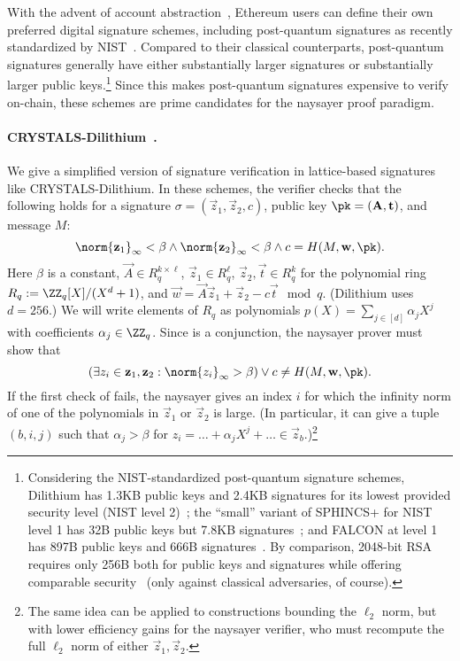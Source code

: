 With the advent of account abstraction~\cite{accountabstraction}, Ethereum users can define their own preferred digital signature schemes, including post-quantum signatures as recently standardized by NIST~\cite{CCS:BHKNRS19,TCHES:DKLLS18,NISTPQC:FALCON22}.
Compared to their classical counterparts, post-quantum signatures generally have either substantially larger signatures or substantially larger public keys.\footnote{Considering the NIST-standardized post-quantum signature schemes, Dilithium has 1.3KB public keys and 2.4KB signatures for its lowest provided security level (NIST level 2)~\cite{dilithium-spec}; the ``small'' variant of SPHINCS+ for NIST level 1 has 32B public keys but 7.8KB signatures~\cite{sphincsplus-spec}; and FALCON at level 1 has 897B public keys and 666B signatures~\cite{falcon-spec}. By comparison, 2048-bit RSA requires only 256B both for public keys and signatures while offering comparable security~\cite{keylength} (only against classical adversaries, of course).}
Since this makes post-quantum signatures expensive to verify on-chain, these schemes are prime candidates for the naysayer proof paradigm.

\paragraph{CRYSTALS-Dilithium~\cite{TCHES:DKLLS18}.} We give a simplified version of signature verification in lattice-based signatures like CRYSTALS-Dilithium. In these schemes, the verifier checks that the following holds for a signature $\sigma=(\vec{z}_1,\vec{z}_2,c)$, public key $\pk=(\vec{A},\vec{t})$, and message $M$:
\begin{equation}\label{eq:crystals_verifier_check}
    \norm{\vec{z}_1}_\infty < \beta \land
    \norm{\vec{z}_2}_\infty < \beta \land 
    c=H(M, \vec{w}, \pk).
\end{equation}
Here $\beta$ is a constant, $\vec{A}\in R_q^{k\times \ell}$, $\vec{z}_1 \in R_q^\ell$, $\vec{z}_2,\vec{t}\in R_q^k$ for the polynomial ring $R_q:=\ZZ_q[X]/(X^d+1)$, and $\vec{w} = \vec{A}\vec{z}_1+\vec{z}_2-c\vec{t} \mod{q}$. (Dilithium uses $d=256$.) We will write elements of $R_q$ as polynomials $p(X) = \sum_{j\in[d]} \alpha_j X^j$ with coefficients $\alpha_j \in \ZZ_q$.
Since  is a conjunction, the naysayer prover must show that
\begin{equation}\label{eq:crystals_naysayer_prover}
    \left( \exists z_i \in \vec{z}_1,\vec{z}_2: \norm{z_i}_\infty > \beta \right) \lor 
    c\neq H(M, \vec{w}, \pk).
\end{equation}
If the first check of  fails, the naysayer gives an index $i$ for which the infinity norm of one of the polynomials in $\vec{z}_1$ or $\vec{z}_2$ is large. (In particular, it can give a tuple $(b,i,j)$ such that $\alpha_j > \beta$ for $z_i = \dots + \alpha_j X^j + \dots \in \vec{z}_b$.)\footnote{The same idea can be applied to constructions bounding the $\ell_2$ norm, but with lower efficiency gains for the naysayer verifier, who must recompute the full $\ell_2$ norm of either $\vec{z}_1,\vec{z}_2$.}

